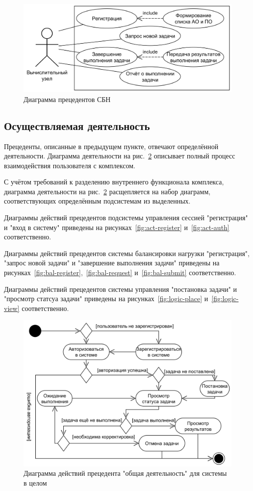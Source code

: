 \documentclass[a4paper,12pt]{report}
\numberwithin{equation}{section}
\begin{document}
\begin{figure}
  \centering
  \includegraphics[width=.6\linewidth]{diagrams/balancer/usecase}
  \caption{Диаграмма прецедентов СБН}
  \label{fig:prec-balancer}
\end{figure}

\subsection{Осуществляемая деятельность}
Прецеденты, описанные в предыдущем пункте, отвечают определённой деятельности.
Диаграмма деятельности на рис.~\ref{fig:act-common} описывает полный процесс взаимодействия пользователя с комплексом.

С учётом требований к разделению внутреннего функционала комплекса, диаграмма деятельности на рис.~\ref{fig:act-common}
расщепляется на набор диаграмм, соответствующих определённым подсистемам из выделенных.

Диаграммы действий прецедентов подсистемы управления сессией "регистрация" и "вход в систему" приведены на рисунках~\ref{fig:act-register} и~\ref{fig:act-auth} соответственно.

Диаграммы действий прецедентов системы балансировки нагрузки "регистрация", "запрос новой задачи" и "завершение выполнения задачи" приведены на рисунках~\ref{fig:bal-register},~\ref{fig:bal-request} и~\ref{fig:bal-submit} соответственно.

Диаграммы действий прецедентов системы управления "постановка задачи" и "просмотр статсуа задачи" приведены на рисунках~\ref{fig:logic-place} и~\ref{fig:logic-view} соответственно.

\begin{figure}[h]
  \centering
  \includegraphics[width=.9\linewidth]{diagrams/common/activity}
  \caption{Диаграмма действий прецедента "общая деятельность" для системы в целом}
  \label{fig:act-common}
\end{figure}
\end{document}
